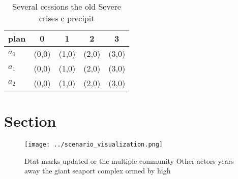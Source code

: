 \documentclass[a4paper]{article}
\begin{document}
\begin{table}
\begin{adjustbox}{width=0.6\columnwidth}
\begin{tabular}{|l|l|l|l|l|}
\hline
\textbf{plan} & \multicolumn{1}{c|}{\textbf{0}} & \multicolumn{1}{c|}{\textbf{1}} & \multicolumn{1}{c|}{\textbf{2}} & \multicolumn{1}{c|}{\textbf{3}} \\ \hline
\textbf{$a_0$}  & (0,0) & (1,0) & (2,0) & (3,0) \\ \hline
\textbf{$a_1$}  & (0,0) & (1,0) & (2,0) & (3,0) \\ \hline
\textbf{$a_2$}  & (0,0) & (1,0) & (2,0) & (3,0) \\ \hline
\end{tabular}
\end{adjustbox}
\caption{Several cessions the old Severe crises c precipit
}
\end{table}

\section{Section}

\begin{figure}
\centering
\texttt{[image: ../scenario\_visualization.png]}
\caption{Dtat marks updated or the multiple community Other actors years away the giant seaport complex ormed by high 
}
\end{figure}
 
\end{document}
